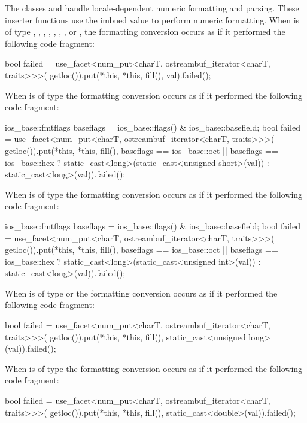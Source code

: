 \begin{itemdescr}
\pnum
\effects
The classes
and
handle locale-dependent numeric formatting and
parsing.
These inserter functions use the imbued
value to perform numeric formatting.
When 
is of type
,
,
,
, ,
,
,
or
,
the formatting conversion occurs as if it performed the following code fragment:
\begin{codeblock}
bool failed = use_facet<num_put<charT, ostreambuf_iterator<charT, traits>>>(
  getloc()).put(*this, *this, fill(), val).failed();
\end{codeblock}

When  is of type
the formatting conversion occurs as if it performed the following code fragment:
\begin{codeblock}
ios_base::fmtflags baseflags = ios_base::flags() & ios_base::basefield;
bool failed = use_facet<num_put<charT, ostreambuf_iterator<charT, traits>>>(
  getloc()).put(*this, *this, fill(),
    baseflags == ios_base::oct || baseflags == ios_base::hex
      ? static_cast<long>(static_cast<unsigned short>(val))
      : static_cast<long>(val)).failed();
\end{codeblock}

When  is of type
the formatting conversion occurs as if it performed the following code fragment:
\begin{codeblock}
ios_base::fmtflags baseflags = ios_base::flags() & ios_base::basefield;
bool failed = use_facet<num_put<charT, ostreambuf_iterator<charT, traits>>>(
  getloc()).put(*this, *this, fill(),
    baseflags == ios_base::oct || baseflags == ios_base::hex
      ? static_cast<long>(static_cast<unsigned int>(val))
      : static_cast<long>(val)).failed();
\end{codeblock}

When  is of type
or
the formatting conversion occurs as if it performed the following code fragment:
\begin{codeblock}
bool failed = use_facet<num_put<charT, ostreambuf_iterator<charT, traits>>>(
  getloc()).put(*this, *this, fill(), static_cast<unsigned long>(val)).failed();
\end{codeblock}

When  is of type
the formatting conversion occurs as if it performed the following code fragment:
\begin{codeblock}
bool failed = use_facet<num_put<charT, ostreambuf_iterator<charT, traits>>>(
  getloc()).put(*this, *this, fill(), static_cast<double>(val)).failed();
\end{codeblock}


\end{itemdescr}
